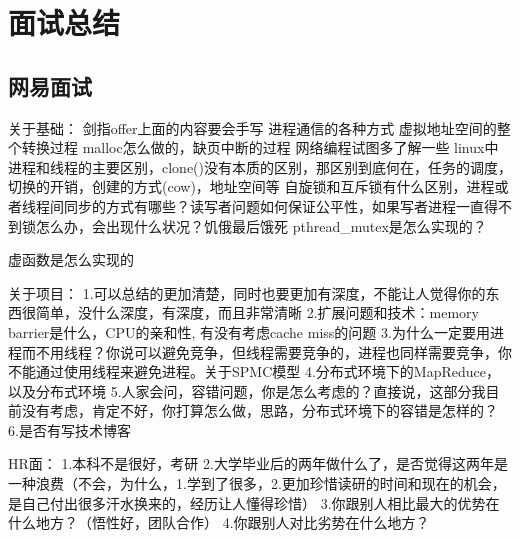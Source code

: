 \section{面试总结}

\subsection{网易面试}
关于基础：
剑指offer上面的内容要会手写
进程通信的各种方式
虚拟地址空间的整个转换过程
malloc怎么做的，缺页中断的过程
网络编程试图多了解一些
linux中进程和线程的主要区别，clone()没有本质的区别，那区别到底何在，任务的调度，切换的开销，创建的方式(cow)，地址空间等
自旋锁和互斥锁有什么区别，进程或者线程间同步的方式有哪些？读写者问题如何保证公平性，如果写者进程一直得不到锁怎么办，会出现什么状况？饥俄最后饿死
pthread\_mutex是怎么实现的？

虚函数是怎么实现的

关于项目：
1.可以总结的更加清楚，同时也要更加有深度，不能让人觉得你的东西很简单，没什么深度，有深度，而且非常清晰
2.扩展问题和技术：memory barrier是什么，CPU的亲和性, 有没有考虑cache miss的问题
3.为什么一定要用进程而不用线程？你说可以避免竞争，但线程需要竞争的，进程也同样需要竞争，你不能通过使用线程来避免进程。关于SPMC模型
4.分布式环境下的MapReduce，以及分布式环境
5.人家会问，容错问题，你是怎么考虑的？直接说，这部分我目前没有考虑，肯定不好，你打算怎么做，思路，分布式环境下的容错是怎样的？
6.是否有写技术博客

HR面：
1.本科不是很好，考研
2.大学毕业后的两年做什么了，是否觉得这两年是一种浪费（不会，为什么，1.学到了很多，2.更加珍惜读研的时间和现在的机会，是自己付出很多汗水换来的，经历让人懂得珍惜）
3.你跟别人相比最大的优势在什么地方？（悟性好，团队合作）
4.你跟别人对比劣势在什么地方？
